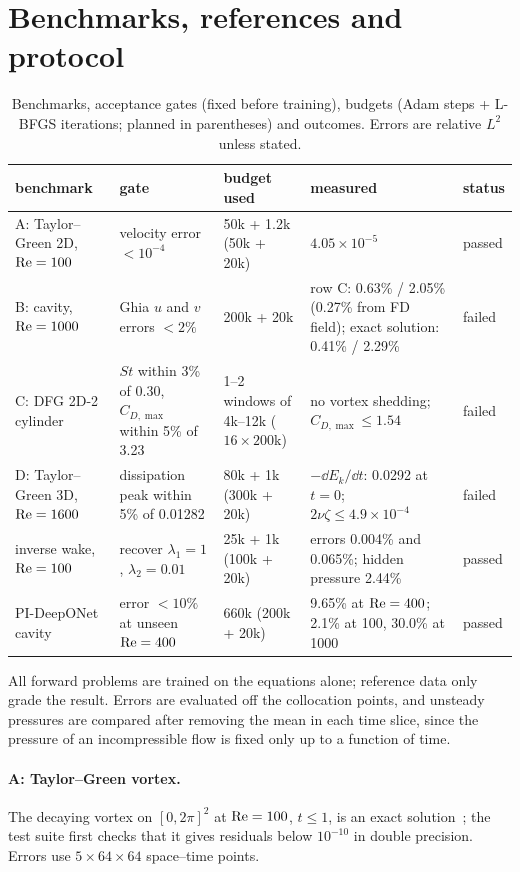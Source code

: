 \section{Benchmarks, references and protocol}
\label{sec:setup}

\begin{table}[t]
\centering
\caption{Benchmarks, acceptance gates (fixed before training), budgets (Adam steps + L-BFGS iterations; planned in
parentheses) and outcomes. Errors are relative $L^2$ unless stated.}
\label{tab:gates}
\small
\begin{tabular}{@{}p{2.6cm}p{3.6cm}p{2.9cm}p{4.7cm}l@{}}
\toprule
benchmark & gate & budget used & measured & status\\
\midrule
A: Taylor--Green 2D, $\mathrm{Re}=100$ & velocity error $<10^{-4}$ & 50k + 1.2k (50k + 20k) & $4.05\times10^{-5}$ & passed\\
B: cavity, $\mathrm{Re}=1000$ & Ghia $u$ and $v$ errors $<2\%$ & 200k + 20k & row C: 0.63\% / 2.05\% (0.27\% from FD field); exact solution: 0.41\% / 2.29\% & failed\\
C: DFG 2D-2 cylinder & $St$ within 3\% of 0.30, $C_{D,\max}$ within 5\% of 3.23 & 1--2 windows of 4k--12k ($16\times200$k) & no vortex shedding; $C_{D,\max}\le1.54$ & failed\\
D: Taylor--Green 3D, $\mathrm{Re}=1600$ & dissipation peak within 5\% of 0.01282 & 80k + 1k (300k + 20k) & $-\dd E_k/\dd t$: 0.0292 at $t=0$; $2\nu\zeta\le4.9\times10^{-4}$ & failed\\
inverse wake, $\mathrm{Re}=100$ & recover $\lambda_1=1$, $\lambda_2=0.01$ & 25k + 1k (100k + 20k) & errors 0.004\% and 0.065\%; hidden pressure 2.44\% & passed\\
PI-DeepONet cavity & error $<10\%$ at unseen $\mathrm{Re}=400$ & 660k (200k + 20k) & 9.65\% at $\mathrm{Re}=400$; 2.1\% at 100, 30.0\% at 1000 & passed\\
\bottomrule
\end{tabular}
\end{table}

All forward problems are trained on the equations alone; reference data only grade the result. Errors are
evaluated off the collocation points, and unsteady pressures are compared after removing the mean in each time
slice, since the pressure of an incompressible flow is fixed only up to a function of time.

\paragraph{A: Taylor--Green vortex.} The decaying vortex on $[0,2\pi]^2$ at $\mathrm{Re}=100$, $t\le1$, is an exact
solution~\cite{taylor1937}; the test suite first checks that it gives residuals below $10^{-10}$ in double
precision. Errors use $5\times64\times64$ space--time points.

